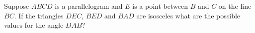 Suppose $ABCD$ is a parallelogram and $E$ is a point between $B$ and $C$ on the line $BC$.  If the triangles $DEC$,  $BED$ and $BAD$ are isosceles what are the possible values for the angle $DAB$?